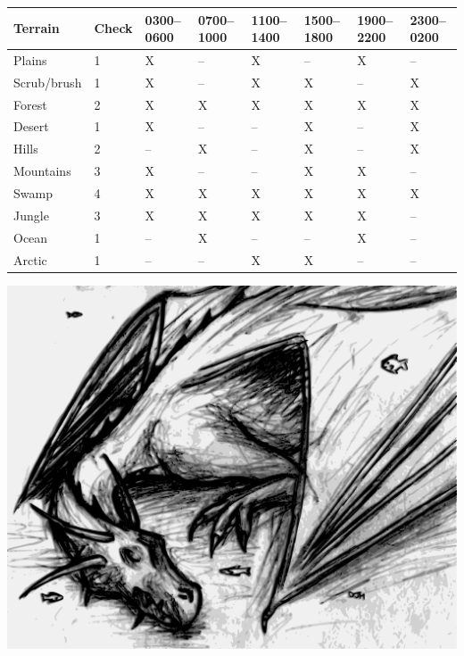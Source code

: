 \noindent
\begin{minipage}{\columnwidth}

\label{terrainencounter}
\noindent
\begin{tabular}{|p{}|p{}|p{}|p{}|p{}|p{}|p{}|p{}|}
\hline
Terrain	& Check	& 0300--0600 	& 0700--1000	& 1100--1400	& 1500--1800	& 1900--2200	& 2300--0200 \\
\hline\hline
\rowcolor[gray]{.9}Plains		& 1	& X		& --	& X		& --	& X		& -- \\
Scrub/brush	& 1	& X		& --	& X		& X		& --	& X \\
\rowcolor[gray]{.9}Forest		& 2	& X		& X		& X		& X		& X		& X \\
Desert		& 1	& X		& --	& --	& X		& --	& X \\
\rowcolor[gray]{.9}Hills		& 2	& --	& X		& --	& X		& --	& X \\
Mountains	& 3	& X		& --	& --	& X		& X		& -- \\
\rowcolor[gray]{.9}Swamp		& 4	& X		& X		& X		& X		& X		& X \\
Jungle		& 3	& X		& X		& X		& X		& X		& -- \\
\rowcolor[gray]{.9}Ocean		& 1	& --	& X		& --	& --	& X		& -- \\
Arctic		& 1	& --	& --	& X		& X		& --	& -- \\
\hline
\end{tabular}

\end{minipage}

\noindent\includegraphics[width=.99\textwidth]{sarkothion.pdf}\label{sarkothian}

